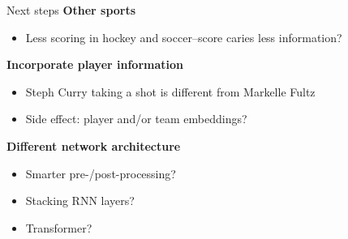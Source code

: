 \begin{frame}{Next steps}
	\textbf{Other sports}

	\begin{itemize}
		\item Less scoring in hockey and soccer--score caries less information?
	\end{itemize}

	\pause \bigskip

	\textbf{Incorporate player information}

	\begin{itemize}
		\item Steph Curry taking a shot is different from Markelle Fultz
		\item Side effect: player and/or team embeddings?
	\end{itemize}

	\pause \bigskip

	\textbf{Different network architecture}

	\begin{itemize}
		\item Smarter pre-/post-processing?
		\item Stacking RNN layers?
		\item Transformer?
	\end{itemize}
\end{frame}
